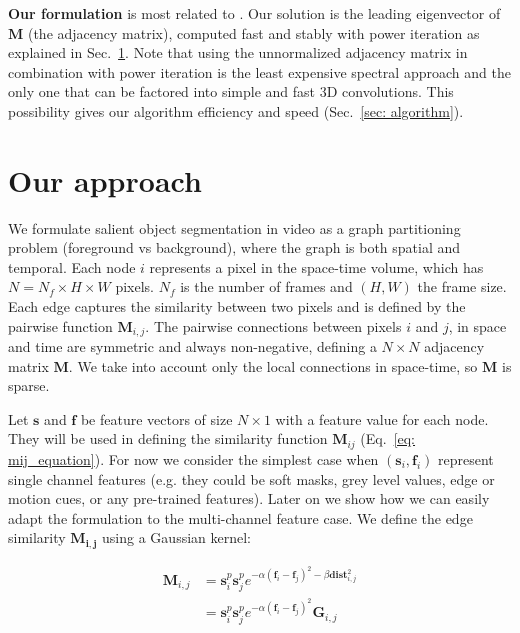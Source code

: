 \documentclass{article}
\begin{document}
\textbf{Our formulation} is most related to \cite{marius_iccv2005,meila_shi}. Our solution is the leading eigenvector of $\mathbf{M}$ (the adjacency matrix), computed fast and stably with power iteration as explained in Sec.~\ref{sec: math_formulation}. Note that using the unnormalized adjacency matrix in combination with power iteration is the least expensive spectral approach and the only one that can be factored into simple and fast 3D convolutions. This possibility gives our algorithm efficiency and speed (Sec.~\ref{sec: algorithm}). 
 

\section{Our approach}
\label{sec: math_formulation}


We formulate salient object segmentation in video as a graph partitioning problem (foreground vs background), where the graph is both spatial and temporal. Each node $i$ represents a pixel in the space-time volume, which has $N = N_f \times H \times W$ pixels. $N_f$ is the number of frames and $(H,W)$ the frame size. Each edge captures the similarity between two pixels and is defined by the pairwise function $\mathbf{M}_{i, j}$. The pairwise connections between pixels $i$ and $j$, in space and time are symmetric and always non-negative, defining a $N \times N$ adjacency matrix $\mathbf{M}$. We take into account only the local connections in space-time, so $\mathbf{M}$ is sparse. 

Let $\mathbf{s}$ and $\mathbf{f}$ be feature vectors of size $N \times 1$ with a feature value for each node. They will be used in defining the similarity function $\mathbf{M}_{ij}$ (Eq.~\ref{eq: mij_equation}).
For now we consider the simplest case when $(\mathbf{s}_i,\mathbf{f}_i)$ represent single channel features (e.g. they could be soft masks, grey level values, edge or motion cues, or any pre-trained features). Later on we show how we can easily adapt the formulation to the multi-channel feature case. We define the edge similarity $\mathbf{M_{i, j}}$ using a Gaussian kernel:

\begin{equation}
    \begin{aligned}
        \mathbf{M}_{i,j} &= \mathbf{s}_i^p \mathbf{s}_j^p e^{- \alpha ( \mathbf{f}_i -  \mathbf{f}_j)^2 - \beta \mathbf{dist}^2_{i, j}} \\
        &= \mathbf{s}_i^p \mathbf{s}_j^p e^{- \alpha ( \mathbf{f}_i -  \mathbf{f}_j)^2} \mathbf{G}_{i, j}
    \end{aligned}
	\label{eq: mij_equation}
\end{equation}
\end{document}
